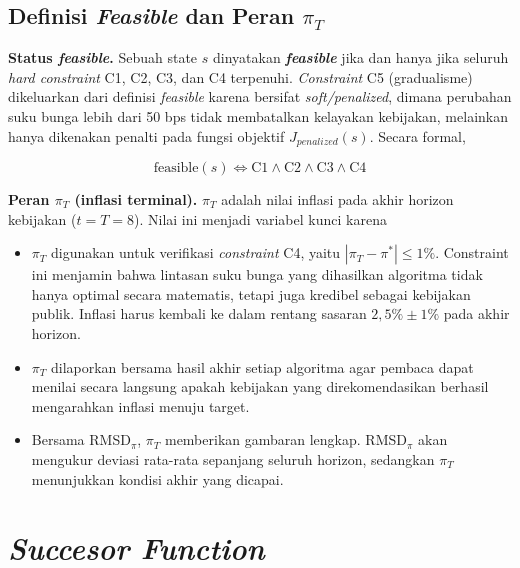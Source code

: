 \subsection{Definisi \textit{Feasible} dan Peran $\pi_T$}

\textbf{Status \textit{feasible}.} Sebuah state $s$ dinyatakan \textbf{\textit{feasible}} jika dan hanya jika seluruh \textit{hard constraint} C1, C2, C3, dan C4 terpenuhi. \textit{Constraint} C5 (gradualisme) dikeluarkan dari definisi \textit{feasible} karena bersifat \textit{soft/penalized}, dimana perubahan suku bunga lebih dari 50 bps tidak membatalkan kelayakan kebijakan, melainkan hanya dikenakan penalti pada fungsi objektif $J_{penalized}(s)$. Secara formal,

\[
    \text{feasible}(s) \iff \text{C1} \land \text{C2} \land \text{C3} \land \text{C4}
\]

\textbf{Peran $\pi_T$ (inflasi terminal).} $\pi_T$ adalah nilai inflasi pada akhir horizon kebijakan ($t = T = 8$). Nilai ini menjadi variabel kunci karena

\begin{itemize}
    \item $\pi_T$ digunakan untuk verifikasi \textit{constraint} C4, yaitu $|\pi_T - \pi^{*}| \leq 1\%$. Constraint ini menjamin bahwa lintasan suku bunga yang dihasilkan algoritma tidak hanya optimal secara matematis, tetapi juga kredibel sebagai kebijakan publik. Inflasi harus kembali ke dalam rentang sasaran $2{,}5\% \pm 1\%$ pada akhir horizon.
    \item $\pi_T$ dilaporkan bersama hasil akhir setiap algoritma agar pembaca dapat menilai secara langsung apakah kebijakan yang direkomendasikan berhasil mengarahkan inflasi menuju target.
    \item Bersama RMSD$_{\pi}$, $\pi_T$ memberikan gambaran lengkap. RMSD$_{\pi}$ akan mengukur deviasi rata-rata sepanjang seluruh horizon, sedangkan $\pi_T$ menunjukkan kondisi akhir yang dicapai.
\end{itemize}

\section{\textit{Succesor Function}}

